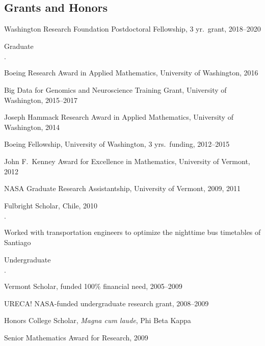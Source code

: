 \documentclass[margin,line]{res}
\newenvironment{list1}{
  \begin{list}{$\cdot$}{%
      \setlength{\itemsep}{0in}
      \setlength{\parsep}{0in} \setlength{\parskip}{0in}
      \setlength{\topsep}{0in} \setlength{\partopsep}{0in} 
      \setlength{\leftmargin}{0.17in}}}{\end{list}}
\begin{document}
\begin{resume}

  \section{\sc Grants and Honors} 
  
  Washington Research Foundation Postdoctoral Fellowship, 
  3 yr.\ grant,
  2018--2020

  {Graduate}
  \begin{list1}
  \item
    Boeing Research Award in Applied Mathematics,
    University of Washington, 2016
  \item 
    Big Data for Genomics and Neuroscience Training Grant,
    University of Washington,
    2015--2017
  \item
    Joseph Hammack Research Award in Applied Mathematics, 
    University of Washington, 2014
  \item 
    Boeing Fellowship, University of Washington, 
    3 yrs.\ funding,
    2012--2015
  \item 
    John F.\ Kenney Award for Excellence in Mathematics, 
    University of Vermont, 2012
  \item
    NASA Graduate Research Assistantship, University of Vermont,
    2009, 2011
  \end{list1}

  {Fulbright Scholar}, Chile, 2010
  \begin{list1}
    \item Worked with transportation engineers to optimize the nighttime
      bus timetables of Santiago
  \end{list1}

  {Undergraduate}
  \begin{list1}
  \item
    Vermont Scholar, 
    funded 100\% financial need,
    2005--2009
  \item
    URECA! NASA-funded undergraduate research grant, 2008--2009
  \item
    Honors College Scholar, \textit{Magna cum laude}, Phi Beta Kappa
  \item 
    Senior Mathematics Award for Research, 2009
  \end{list1}


\end{resume}
\end{document}
